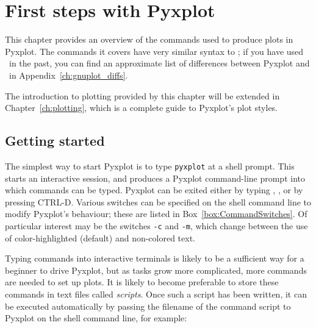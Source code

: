 %
%
%
%
%



\chapter{First steps with Pyxplot}
\label{ch:first_steps}

This chapter provides an overview of the commands used to produce plots in
Pyxplot. The commands it covers have very similar syntax to \gnuplot; if you
have used \gnuplot\ in the past, you can find an approximate list of
differences between Pyxplot and \gnuplot\ in Appendix~\ref{ch:gnuplot_diffs}.

The introduction to plotting provided by this chapter will be extended in
Chapter~\ref{ch:plotting}, which is a complete guide to Pyxplot's plot styles.

\section{Getting started}

The simplest way to start Pyxplot is to type {\tt pyxplot} at a shell prompt.
This starts an interactive session, and produces a Pyxplot command-line prompt
into which commands can be typed. Pyxplot can be exited either by typing
, , or by pressing CTRL-D. Various switches can
be specified on the shell command line to modify Pyxplot's behaviour; these are
listed in Box~\ref{box:CommandSwitches}.  Of particular interest may be the
switches {\tt -c} and {\tt -m}, which change between the use of
color-highlighted (default) and non-colored text.

Typing commands into interactive terminals is likely to be a sufficient way for
a beginner to drive Pyxplot, but as tasks grow more complicated, more commands
are needed to set up plots. It is likely to become preferable to store
these commands in text files called {\it scripts}.  Once such a script has been
written, it can be executed automatically by passing the filename of the
command script to Pyxplot on the shell command line, for
example:

